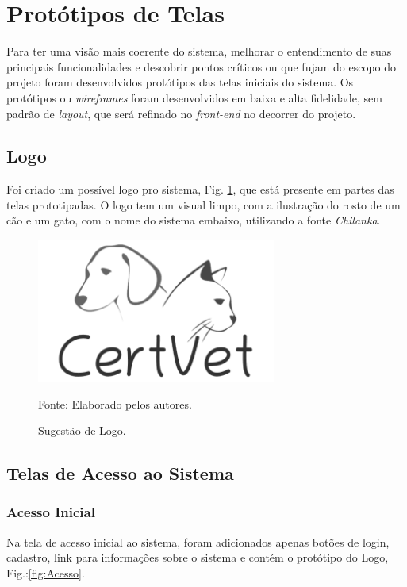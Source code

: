 \documentclass[
    12pt,               %
    openright,          %
    oneside,
    a4paper,            %
    BIBLATEX,           %
    TODO,               %
    english,            %
    brazil              %
    ]{ifsp-spo-inf-ctds}
\begin{document}
    \section{Protótipos de Telas}   
    Para ter uma visão mais coerente do sistema, melhorar o entendimento de suas principais funcionalidades e descobrir pontos críticos ou que fujam do escopo do projeto foram desenvolvidos protótipos das telas iniciais do sistema. 
    Os protótipos ou \emph{wireframes} foram desenvolvidos em baixa e alta fidelidade, sem padrão de \emph{layout}, que será refinado no \emph{front-end} no decorrer do projeto.

    \subsection{Logo}
    Foi criado um possível logo pro sistema, Fig. \ref{fig:logo}, que está presente em partes das telas prototipadas.
    O logo tem um visual limpo, com a ilustração do rosto de um cão e um gato, com o nome do sistema embaixo, utilizando a fonte \emph{Chilanka}.
    \begin{figure}[H]
                \centering
                \caption{Sugestão de Logo.}
                \includegraphics[width=0.7\textwidth]{images/Telas/proposta-logo.png}
                
                \label{fig:logo}
                \centering
        {\footnotesize Fonte: Elaborado pelos autores.}
            \end{figure}

    \subsection{Telas de Acesso ao Sistema}

\subsubsection{Acesso Inicial}
Na tela de acesso inicial ao sistema, foram adicionados apenas botões de login, cadastro, link para informações sobre o sistema e contém o protótipo do Logo, Fig.:\ref{fig:Acesso}.
\end{document}

